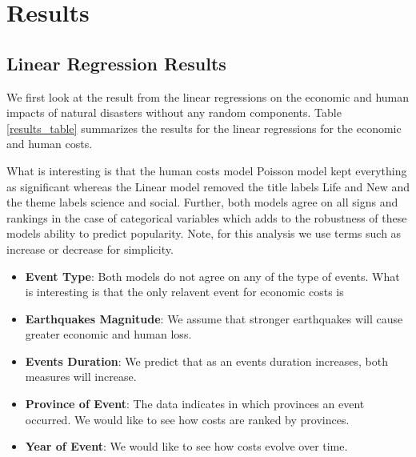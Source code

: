 \section{Results}
\subsection{Linear Regression Results}
We first look at the result from the linear regressions on the economic and human impacts of natural disasters without any random components. Table \ref{results_table} summarizes the results for the linear regressions for the economic and human costs.



What is interesting is that the human costs model Poisson model kept everything as significant whereas the Linear model removed the title labels Life and New and the theme labels science and social. Further, both models agree on all signs and rankings in the case of categorical variables which adds to the robustness of these models ability to predict popularity. 
Note, for this analysis we use terms such as increase or decrease for simplicity.

\begin{itemize}
	\item \textbf{Event Type}: Both models do not agree on any of the type of events. What is interesting is that the only relavent event for economic costs is 
	\item \textbf{Earthquakes Magnitude}: We assume that stronger earthquakes will cause greater economic and human loss.
	\item \textbf{Events Duration}: We predict that as an events duration increases, both measures will increase. 
	\item \textbf{Province of Event}: The data indicates in which provinces an event occurred. We would like to see how costs are ranked by provinces.
	\item \textbf{Year of Event}: We would like to see how costs evolve over time. 
\end{itemize}


